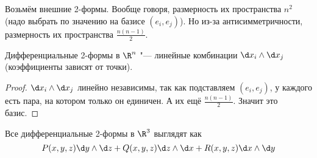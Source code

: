 \begin{Rem}
	Возьмём внешние 2-формы.
	Вообще говоря, размерность их пространства $n^2$ (надо выбрать по значению на базисе $(e_i, e_j)$).
	Но из-за антисимметричности, размерность их пространства $\frac{n(n-1)}2$.
\end{Rem}

\begin{theorem}
	Дифференциальные 2-формы в $\R^n$ "--- линейные комбинации $\d x_i \wedge \d x_j$ (коэффициенты зависят от точки).
\end{theorem}
\begin{proof}
	$\d x_i \wedge \d x_j$ линейно независимы, так как подставляем $(e_i, e_j)$, у каждого есть пара, на котором только он единичен.
	А их ещё $\frac{n(n-1)}2$.
	Значит это базис.
\end{proof}

\begin{conseq}
	Все дифференциальные 2-формы в $\R^3$ выглядят как
	\[ P(x, y, z) \d y \wedge \d z + Q(x, y, z) \d z \wedge \d x + R(x, y, z) \d x \wedge \d y \]
\end{conseq}
